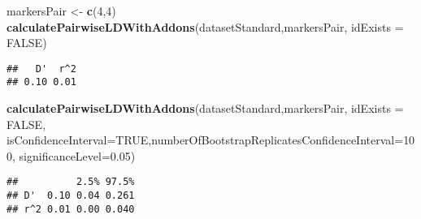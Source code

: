 \documentclass[
]{article}
\newenvironment{Shaded}{\begin{snugshade}}{\end{snugshade}}
\newcommand{\AttributeTok}[1]{\textcolor[rgb]{0.13,0.29,0.53}{#1}}
\newcommand{\ConstantTok}[1]{\textcolor[rgb]{0.56,0.35,0.01}{#1}}
\newcommand{\DecValTok}[1]{\textcolor[rgb]{0.00,0.00,0.81}{#1}}
\newcommand{\FloatTok}[1]{\textcolor[rgb]{0.00,0.00,0.81}{#1}}
\newcommand{\FunctionTok}[1]{\textcolor[rgb]{0.13,0.29,0.53}{\textbf{#1}}}
\newcommand{\NormalTok}[1]{#1}
\newcommand{\OtherTok}[1]{\textcolor[rgb]{0.56,0.35,0.01}{#1}}
\begin{document}
\begin{Shaded}
\begin{Highlighting}[]
\NormalTok{markersPair }\OtherTok{\textless{}{-}} \FunctionTok{c}\NormalTok{(}\DecValTok{4}\NormalTok{,}\DecValTok{4}\NormalTok{)}
\FunctionTok{calculatePairwiseLDWithAddons}\NormalTok{(datasetStandard,markersPair, }\AttributeTok{idExists =} \ConstantTok{FALSE}\NormalTok{)}
\end{Highlighting}
\end{Shaded}

\begin{verbatim}
##   D'  r^2 
## 0.10 0.01
\end{verbatim}

\begin{Shaded}
\begin{Highlighting}[]
\FunctionTok{calculatePairwiseLDWithAddons}\NormalTok{(datasetStandard,markersPair, }\AttributeTok{idExists =} \ConstantTok{FALSE}\NormalTok{, }\AttributeTok{isConfidenceInterval=}\ConstantTok{TRUE}\NormalTok{,}\AttributeTok{numberOfBootstrapReplicatesConfidenceInterval=}\DecValTok{100}\NormalTok{, }\AttributeTok{significanceLevel=}\FloatTok{0.05}\NormalTok{)}
\end{Highlighting}
\end{Shaded}

\begin{verbatim}
##          2.5% 97.5%
## D'  0.10 0.04 0.261
## r^2 0.01 0.00 0.040
\end{verbatim}
\end{document}
